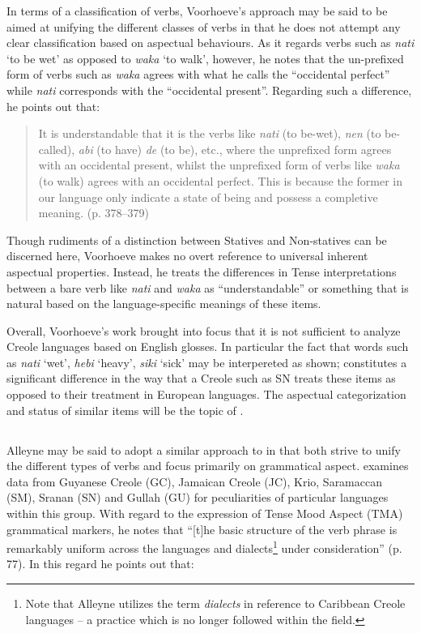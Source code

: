 In terms of a classification of verbs, Voorhoeve’s approach may be
said to be aimed at unifying the different classes of verbs in that he
does not attempt any clear classification based on aspectual
behaviours.  As it regards verbs such as \textit{nati} `to be wet' as
opposed to \textit{waka} `to walk', however, he notes that the
un-prefixed form of verbs such as \textit{waka} agrees with what he
calls the “occidental perfect” while \textit{nati} corresponds with
the “occidental present”.  Regarding such a difference, he points out
that:

\begin{quote}
It is understandable that it is the verbs like \textit{nati} (to
be-wet), \textit{nen} (to be-called), \textit{abi} (to have)
\textit{de} (to be), etc., where the unprefixed form agrees with an
occidental present, whilst the unprefixed form of verbs like
\textit{waka} (to walk) agrees with an occidental perfect.  This is
because the former in our language only indicate a state of being and
possess a completive meaning. (p. 378--379)
\end{quote}

Though rudiments of a distinction between Statives and Non-statives
can be discerned here, Voorhoeve makes no overt reference to universal
inherent aspectual properties.  Instead, he treats the differences in
Tense interpretations between a bare verb like \textit{nati} and
\textit{waka} as “understandable” or something that is natural based
on the language-specific meanings of these items.

Overall, Voorhoeve’s work brought into focus that it is not sufficient
to analyze Creole languages based on English glosses.  In particular
the fact that words such as \textit{nati} `wet', \textit{hebi}
`heavy', \textit{siki} `sick' may be interpereted as shown; constitutes a significant difference in
the way that a Creole such as SN treats these items as opposed to
their treatment in European languages.  The aspectual categorization
and status of similar items will be the topic of .

\subsection{\citet{Alleyne1980}}\label{sec:2.1.2}

Alleyne may be said to adopt a similar approach to
\citet{Voorhoeve1957} in that both strive to unify the different types
of verbs and focus primarily on grammatical aspect.
\citet{Alleyne1980} examines data from Guyanese Creole (GC), Jamaican
Creole (JC), Krio, Saramaccan (SM), Sranan (SN) and Gullah (GU) for
peculiarities of particular languages within this group.  With regard
to the expression of Tense Mood Aspect (TMA) grammatical markers, he
notes that ``[t]he basic structure of the verb phrase is remarkably
uniform across the languages and dialects\footnote{Note that Alleyne
  utilizes the term \textit{dialects} in reference to Caribbean Creole
  languages -- a practice which is no longer followed within the field.}
under consideration” (p. 77).  In this regard he points out that:

